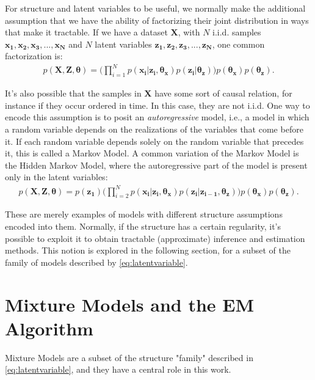 For structure and latent variables to be useful, we normally make the additional
assumption that we have the ability of factorizing their joint distribution in ways that
make it tractable. If we have a dataset $\bm{X}$, with $N$ i.i.d. samples $\bm{x_1}, \bm{x_2}, \bm{x_3}, ..., \bm{x_N}$
and $N$ latent variables $\bm{z_1}, \bm{z_2}, \bm{z_3}, ..., \bm{z_N}$, one common factorization is:
\begin{align}
    p(\bm{X}, \bm{Z}, \bm{\theta}) = \Big(\prod^N_{i=1} p(\bm{x_i}| \bm{z_i}, \bm{\theta_x})
                                                        p(\bm{z_i} | \bm{\theta_z})\Big) 
                                                        p(\bm{\theta_x})
                                                        p(\bm{\theta_z}). \label{eq:latentvariable}
\end{align}

It's also possible that the samples in $\bm{X}$ have some sort of causal
relation, for instance if they occur ordered in time. In this case, they are not i.i.d.
One way to encode this assumption is to posit an \emph{autoregressive} model, i.e.,
a model in which a random variable depends on the realizations of the variables
that come before it. If each random variable depends solely on the random variable
that precedes it, this is called a Markov Model. A common variation of the Markov
Model is the Hidden Markov Model, where the autoregressive part of the model is
present only in the latent variables:
\begin{align}
    p(\bm{X}, \bm{Z}, \bm{\theta}) = p(\bm{z_1}) \Big(\prod^N_{i=2} p(\bm{x_i} | \bm{z_i}, \bm{\theta_x})
                                     p(\bm{z_i}| \bm{z_{i-1}}, \bm{\theta_z}) \Big)
                                     p(\bm{\theta_x}) p(\bm{\theta_z}).
\end{align}

These are merely examples of models with different structure assumptions encoded
into them. Normally, if the structure has a certain regularity, it's possible
to exploit it to obtain tractable (approximate) inference and estimation methods.
This notion is explored in the following section, for a subset of the family
of models described by \ref{eq:latentvariable}.

\section{Mixture Models and the EM Algorithm}
\label{section:mmodels}
Mixture Models are a subset of the structure "family" described in \ref{eq:latentvariable},
and they have a central role in this work.

